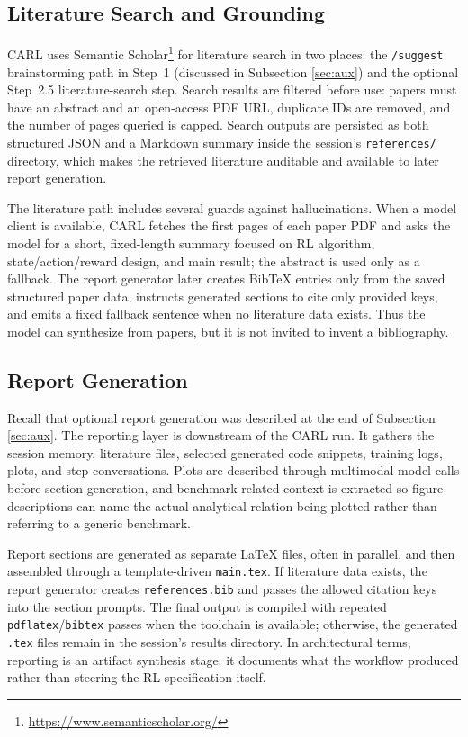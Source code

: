 \documentclass[mnsc,sglanonrev]{informs4}
\begin{document}
\subsection{Literature Search and Grounding}

CARL uses Semantic Scholar\footnote{\url{https://www.semanticscholar.org/}} for literature search in two places:  the \texttt{/suggest} brainstorming path in Step~1 (discussed in Subsection \ref{sec:aux}) and the optional Step~2.5 literature-search step. Search results are filtered before use: papers must have an abstract and an open-access PDF URL, duplicate IDs are removed, and the number of pages queried is capped. Search outputs are persisted as both structured JSON and a Markdown summary inside the session's \texttt{references/} directory, which makes the retrieved literature auditable and available to later report generation.

The literature path includes several guards against hallucinations. When a model client is available, CARL fetches the first pages of each paper PDF and asks the model for a short, fixed-length summary focused on RL algorithm, state/action/reward design, and main result; the abstract is used only as a fallback. The report generator later creates BibTeX entries only from the saved structured paper data, instructs generated sections to cite only provided keys, and emits a fixed fallback sentence when no literature data exists. Thus the model can synthesize from papers, but it is not invited to invent a bibliography.

\subsection{Report Generation}

Recall that optional report generation was described at the end of Subsection \ref{sec:aux}. The reporting layer is downstream of the CARL run. It gathers the session memory, literature files, selected generated code snippets, training logs, plots, and step conversations. Plots are described through multimodal model calls before section generation, and benchmark-related context is extracted so figure descriptions can name the actual analytical relation being plotted rather than referring to a generic benchmark.

Report sections are generated as separate LaTeX files, often in parallel, and then assembled through a template-driven \texttt{main.tex}. If literature data exists, the report generator creates \texttt{references.bib} and passes the allowed citation keys into the section prompts. The final output is compiled with repeated \texttt{pdflatex}/\texttt{bibtex} passes when the toolchain is available; otherwise, the generated \texttt{.tex} files remain in the session's results directory. In architectural terms, reporting is an artifact synthesis stage: it documents what the workflow produced rather than steering the RL specification itself.
\end{document}
